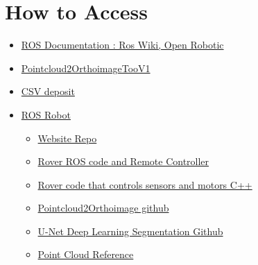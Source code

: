 \documentclass{article}
\begin{document}
\section{How to Access}
\begin{itemize}
    \item \href{https://docs.ros.org}{ROS Documentation : Ros Wiki, Open Robotic}
    \item \href{https://github.com/BrianMojica/pointcloud2orthoimage}{Pointcloud2OrthoimageTooV1}
    \item \href{https://navigatela.lacity.org/navigatela/}{CSV deposit}
    \item \href{https://robots.ros.org/}{ROS Robot}\begin{itemize}
        \item \href{https://github.com/Jdhwang98/boe_sidewalk}{Website Repo}
        \item \href{https://github.com/J-APV/boe-sidewalk-rover}{Rover ROS code and Remote Controller}
        \item \href{https://github.com/J-APV/boe-rover-cpp}{Rover code that controls sensors and motors C++}
        \item \href{https://github.com/BrianMojica/pointcloud2orthoimage}{Pointcloud2Orthoimage github}
        \item \href{https://github.com/zhixuhao/unet}{U-Net Deep Learning Segmentation Github}
        \item \href{https://www.yuhanjiang.com/research/FM/PC/P2I}{Point Cloud Reference}
    \end{itemize}
\end{itemize}
\end{document}
